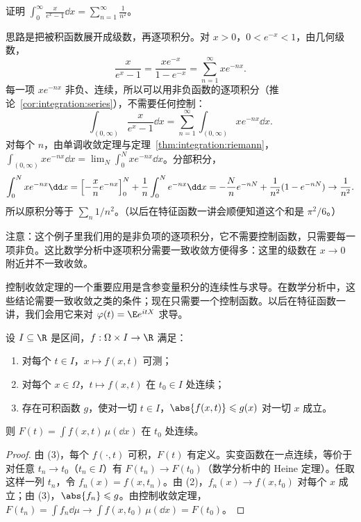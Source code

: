 \begin{workedexample}\label{we:integration:zeta2}
证明 $\displaystyle\int_0^\infty\frac x{e^x-1}\dd x=\sum_{n=1}^\infty\frac1{n^2}$。
\end{workedexample}
\begin{solution}
思路是把被积函数展开成级数，再逐项积分。对 $x>0$，$0<e^{-x}<1$，由几何级数，
\[
\frac x{e^x-1}=\frac{xe^{-x}}{1-e^{-x}}=\sum_{n=1}^\infty xe^{-nx}.
\]
每一项 $xe^{-nx}$ 非负、连续，所以可以用非负函数的逐项积分（推论~\ref{cor:integration:series}），不需要任何控制：
\[
\int_{(0,\infty)}\frac x{e^x-1}\dd x=\sum_{n=1}^\infty\int_{(0,\infty)}xe^{-nx}\dd x .
\]
对每个 $n$，由单调收敛定理与定理~\ref{thm:integration:riemann}，$\int_{(0,\infty)}xe^{-nx}\dd x=\lim_N\int_0^Nxe^{-nx}\dd x$。分部积分，
\[
\int_0^Nxe^{-nx}\dd x=\Bigl[-\frac{x}{n}e^{-nx}\Bigr]_0^N+\frac1n\int_0^Ne^{-nx}\dd x=-\frac Nne^{-nN}+\frac1{n^2}(1-e^{-nN})\to\frac1{n^2}.
\]
所以原积分等于 $\sum_n1/n^2$。（以后在特征函数一讲会顺便知道这个和是 $\pi^2/6$。）

注意：这个例子里我们用的是非负项的逐项积分，它不需要控制函数，只需要每一项非负。这比数学分析中逐项积分需要一致收敛方便得多：这里的级数在 $x\to0$ 附近并不一致收敛。
\end{solution}


控制收敛定理的一个重要应用是含参变量积分的连续性与求导。在数学分析中，这些结论需要一致收敛之类的条件；现在只需要一个控制函数。以后在特征函数一讲，我们会用它来对 $\varphi(t)=\E e^{itX}$ 求导。

\begin{theorem}[含参变量积分的连续性]\label{thm:integration:parameter-continuity}
设 $I\subseteq\R$ 是区间，$f:\Omega\times I\to\R$ 满足：
\begin{enumerate}
\item 对每个 $t\in I$，$x\mapsto f(x,t)$ 可测；
\item 对每个 $x\in\Omega$，$t\mapsto f(x,t)$ 在 $t_0\in I$ 处连续；
\item 存在可积函数 $g$，使对一切 $t\in I$，$\abs{f(x,t)}\leqslant g(x)$ 对一切 $x$ 成立。
\end{enumerate}
则 $F(t)=\int f(x,t)\,\mu(\dd x)$ 在 $t_0$ 处连续。
\end{theorem}
\begin{proof}
由 (3)，每个 $f(\cdot,t)$ 可积，$F(t)$ 有定义。实变函数在一点连续，等价于对任意 $t_n\to t_0$（$t_n\in I$）有 $F(t_n)\to F(t_0)$（数学分析中的 Heine 定理）。任取这样一列 $t_n$，令 $f_n(x)=f(x,t_n)$。由 (2)，$f_n(x)\to f(x,t_0)$ 对每个 $x$ 成立；由 (3)，$\abs{f_n}\leqslant g$。由控制收敛定理，$F(t_n)=\int f_n\dd\mu\to\int f(x,t_0)\,\mu(\dd x)=F(t_0)$。
\end{proof}

